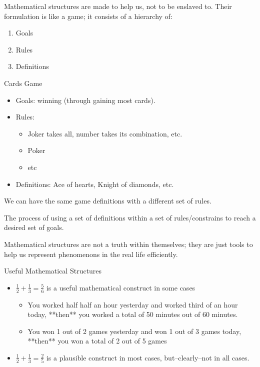 Mathematical structures are made to help us, not to be enslaved to.
Their formulation is like a game; it consists of a hierarchy of:
\begin{enumerate}
    \item Goals
    \item Rules
    \item Definitions
\end{enumerate}

\begin{example}
    Cards Game
    \begin{itemize}
        \item Goals: winning (through gaining most cards).
        \item Rules:
            \begin{itemize}
                \item Joker takes all, number takes its combination, etc.
                    \item Poker
                    \item etc
            \end{itemize}
        \item Definitions: Ace of hearts, Knight of diamonds, etc.
    \end{itemize}
\end{example}

\begin{note}
    We can have the same game definitions with a different set of rules.
\end{note}

\begin{definition}[Logic]
    The process of using a set of definitions within a set of rules/constrains to reach a desired set of goals.
\end{definition}

\begin{note}
    Mathematical structures are not a truth within themselves; they are just tools to help us represent phenomenons in the real life efficiently.
\end{note}
\begin{example}
    Useful Mathematical Structures
    \begin{itemize}
        \item $\frac{1}{2}+\frac{1}{3}=\frac{5}{6}$ is a useful mathematical construct in some cases
            \begin{itemize}
                \item You worked half half an hour yesterday and worked third of an hour today, **then** you worked a total of 50 minutes out of 60 minutes.
                \item You won 1 out of 2 games yesterday and won 1 out of 3 games today, **then** you won a total of 2 out of 5 games
            \end{itemize}
        \item $\frac{1}{2}+\frac{1}{3}=\frac{2}{5}$ is a plausible construct in most cases, but--clearly--not in all cases.
    \end{itemize}
\end{example}

